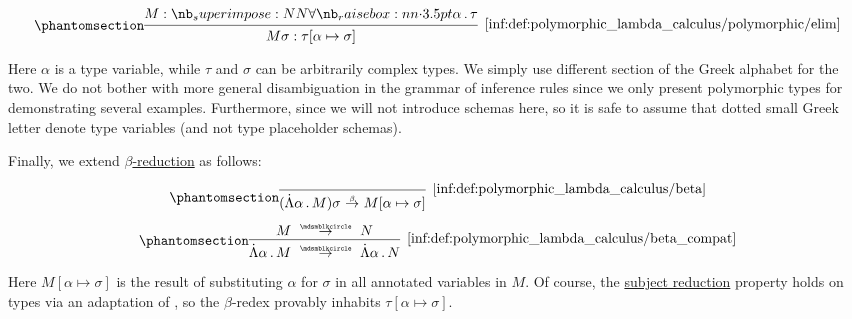 \begin{definition}
\begin{paracol}{2}
    \begin{rightcolumn}
      \ParacolAlignmentHack
      \begin{equation*}\taglabel[\ensuremath{ \forall_- }]{inf:def:polymorphic_lambda_calculus/polymorphic/elim}
        \begin{prooftree}
          \hypo{ M: \qpolytype \alpha \tau }
          \infer1[\ref{inf:def:polymorphic_lambda_calculus/polymorphic/elim}]{ M\sigma: \tau[\alpha \mapsto \sigma] }.
        \end{prooftree}
      \end{equation*}
    \end{rightcolumn}
  \end{paracol}

  Here \( \alpha \) is a type variable, while \( \tau \) and \( \sigma \) can be arbitrarily complex types. We simply use different section of the Greek alphabet for the two. We do not bother with more general disambiguation in the grammar of inference rules since we only present polymorphic types for demonstrating several examples. Furthermore, since we will not introduce schemas here, so it is safe to assume that dotted small Greek letter denote type variables (and not type placeholder schemas).

  Finally, we extend \hyperref[def:typed_term_reduction]{\( \beta \)-reduction} as follows:
  \begin{paracol}{2}
    \begin{leftcolumn}
      \ParacolAlignmentHack
      \begin{equation*}\taglabel[\ensuremath{ \logic{Red}_\Lambda^\beta }]{inf:def:polymorphic_lambda_calculus/beta}
        \begin{prooftree}
          \infer0[\ref{inf:def:polymorphic_lambda_calculus/beta}]{ (\qAbs \alpha M) \sigma \bred M[\alpha \mapsto \sigma] }.
        \end{prooftree}
      \end{equation*}
    \end{leftcolumn}

    \begin{rightcolumn}
      \ParacolAlignmentHack
      \begin{equation*}\taglabel[\ensuremath{ \logic{Red}_\Lambda }]{inf:def:polymorphic_lambda_calculus/beta_compat}
        \begin{prooftree}
          \hypo{ M \pred N }
          \infer1[\ref{inf:def:polymorphic_lambda_calculus/beta_compat}]{ \qAbs \alpha M \pred \qAbs \alpha N }
        \end{prooftree}
      \end{equation*}
    \end{rightcolumn}
  \end{paracol}

  Here \( M[\alpha \mapsto \sigma] \) is the result of substituting \( \alpha \) for \( \sigma \) in all annotated variables in \( M \). Of course, the \hyperref[con:subject_reduction]{subject reduction} property holds on types via an adaptation of , so the \( \beta \)-redex provably inhabits \( \tau[\alpha \mapsto \sigma] \).
\end{definition}
